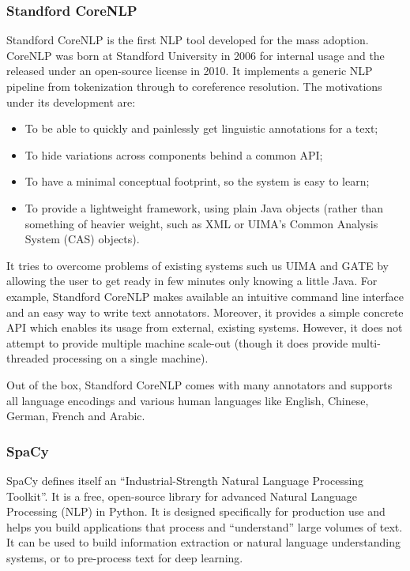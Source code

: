 \subsubsection{Standford CoreNLP}

Standford CoreNLP \cite{manning2014stanford} is the first NLP tool
developed for the mass adoption. CoreNLP was born at Standford
University in 2006 for internal usage and the released under an
open-source license in 2010. It implements a generic NLP pipeline from
tokenization through to coreference resolution. The motivations under
its development are:
\begin{itemize}
  \item To be able to quickly and painlessly get linguistic
  annotations for a text;
  \item To hide variations across components behind a common API;
  \item To have a minimal conceptual footprint, so the system is easy
  to learn;
  \item To provide a lightweight framework, using plain Java objects
  (rather than something of heavier weight, such as XML or UIMA's
  Common Analysis System (CAS) objects).
\end{itemize}
It tries to overcome problems of existing systems such us UIMA
\cite{ferrucci2004uima} and GATE \cite{cunningham2002gate} by allowing
the user to get ready in few minutes only knowing a little Java. For
example, Standford CoreNLP makes available an intuitive command line
interface and an easy way to write text annotators. Moreover, it
provides a simple concrete API which enables its usage from external,
existing systems. However, it does not attempt to provide multiple
machine scale-out (though it does provide multi-threaded processing on
a single machine).

Out of the box, Standford CoreNLP comes with many annotators and
supports all language encodings and various human languages like
English, Chinese, German, French and Arabic.

\subsubsection{SpaCy}

SpaCy \cite{honnibal2020spacy} defines itself an ``Industrial-Strength
Natural Language Processing Toolkit''. It is a free, open-source
library for advanced Natural Language Processing (NLP) in Python. It
is designed specifically for production use and helps you build
applications that process and ``understand'' large volumes of text. It
can be used to build information extraction or natural language
understanding systems, or to pre-process text for deep learning.

